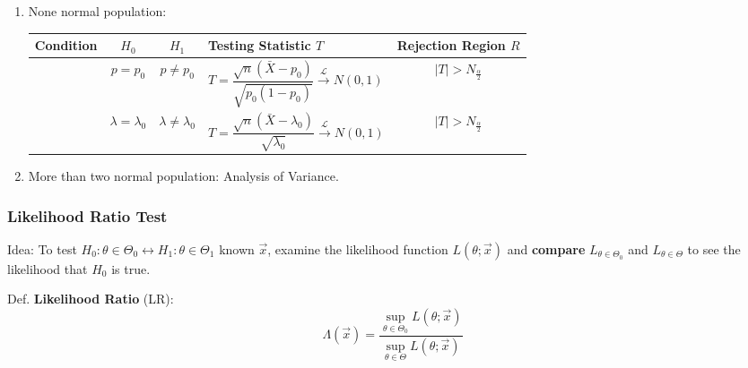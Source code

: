 \begin{enumerate}
\begin{table}[htbp]
\begin{tabularx}{\linewidth}{|c|c|c|Y|c|}
                &$\sigma_1^2\geq\sigma_2^2$&$\sigma_1^2<\sigma_2^2$&&$T>F_{n-1,m-1,\alpha}$\\
                &$\sigma_1^2\leq\sigma_2^2$&$\sigma_1^2>\sigma_2^2$&&$T<F_{n-1,m-1,1-\alpha}$\\
                \hline
        \end{tabularx}
    \end{table}

    \item None normal population:
    
    \begin{table}[htbp]
        \centering
        \renewcommand\arraystretch{1.7}
        \begin{tabularx}{\linewidth}{|c|c|c|Y|c|}
            \hline
            Condition&$H_0$&$H_1$&Testing Statistic $T$&Rejection Region $R$\\
            \hline
            &$p=p_0$&$p\neq p_0$&$T=\dfrac{\sqrt{n}(\bar{X}-p_0)}{\sqrt{p_0(1-p_0)}}\xrightarrow[]{\mathscr{L}}N(0,1)$&$|T|>N_\frac{\alpha}{2}$\\
            \hline
            &$\lambda=\lambda_0$&$\lambda\neq \lambda_0$&$T=\dfrac{\sqrt{n}(\bar{X}-\lambda_0)}{\sqrt{\lambda_0}}\xrightarrow[]{\mathscr{L}}N(0,1)$&$|T|>N_\frac{\alpha}{2}$\\
            \hline
        \end{tabularx}
    \end{table}
    \item More than two normal population: Analysis of Variance.
\end{enumerate}

\subsubsection{Likelihood Ratio Test}\label{SubSectionLRT}
    Idea: To test $H_0:\theta\in\Theta_0\longleftrightarrow H_1:\theta\in\Theta_1$ known $\vec{x}$, examine the likelihood function $L(\theta;\vec{x})$ and \textbf{compare} $L_{\theta\in\Theta_0}$ and $L_{\theta\in\Theta}$ to see the likelihood that $H_0$ is true.

    Def. \textbf{Likelihood Ratio} (LR):
    \begin{equation}
    \Lambda (\vec{x})=\dfrac{{\displaystyle\sup_{\theta\in\Theta_0}L(\theta;\vec{x})}}{{\displaystyle\sup_{\theta\in\Theta}L(\theta;\vec{x})}}
    \end{equation}

